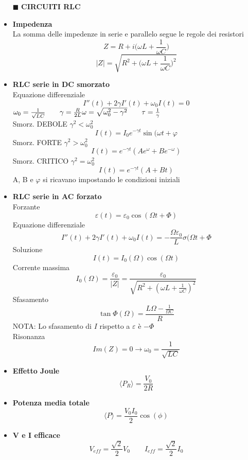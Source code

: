 \documentclass{book}
\newcommand{\g}{\textbf}
\newcommand{\e}{\begin{equation}}
\newcommand{\ex}{\end{equation} }
\renewcommand{\it}{\item[$\cdot$]}
\begin{document}
\begin{multicols*}{4}
\begin{itemize}
\item [$\blacksquare$] \g{CIRCUITI RLC}
    \it \g{Impedenza} \\
    La somma delle impedenze in serie e parallelo segue le regole dei resistori
    \e{Z=R+i\biggl(\omega L+\frac{1}{\omega C}\biggr)} \ex
    \e{|Z|=\sqrt{R^2+\biggl(\omega L+\frac{1}{\omega C}\biggr)^2}} \ex
    \it \g{RLC serie in DC smorzato} \\
    Equazione differenziale
    \e{I''(t)+2\gamma I'(t)+\omega_0 I(t)=0} \ex
    $\omega_0=\frac{1}{\sqrt{LC}} \qquad \gamma=\frac{R}{2L} \\
    \omega=\sqrt{\omega_0^2-\gamma^2} \qquad \tau=\frac{1}{\gamma}$ \\
    Smorz. DEBOLE $\gamma^2<\omega_0^2$
    \e{I(t)=I_0 e^{-\gamma t} \sin(\omega t+\varphi} \ex
    Smorz. FORTE $\gamma^2>\omega_0^2$
    \e{I(t)=e^{-\gamma t}(Ae^\omega+Be^{-\omega})} \ex
    Smorz. CRITICO $\gamma^2=\omega_0^2$
    \e{I(t)=e^{-\gamma t}(A+Bt)} \ex
    A, B e $\varphi$ si ricavano impostando le condizioni iniziali
    \it \g{RLC serie in AC forzato} \\
    Forzante
    \e{\varepsilon(t)=\varepsilon_0\cos(\Omega t + \Phi)} \ex
    Equazione differenziale
    \e{I''(t)+2\gamma I'(t)+\omega_0 I(t)=-\frac{\Omega\varepsilon_0}{L}\sigma(\Omega t + \Phi} \ex
    Soluzione
    \e{I(t)=I_0(\Omega)\cos(\Omega t )} \ex
    Corrente massima
    \e{I_0(\Omega)=\frac{\varepsilon_0}{|Z|}=\frac{\varepsilon_0}{\sqrt{R^2+(\omega L+\frac{1}{\omega C})^2}}} \ex
    Sfasamento
    \e{\tan\Phi(\Omega)=\frac{L\Omega-\frac{1}{\Omega C}}{R}} \ex
    NOTA: Lo sfasamento di $I$ rispetto a $\varepsilon$ è $-\Phi$ \\
    Risonanza
    \e{Im(Z)=0 \rightarrow \omega_0=\frac{1}{\sqrt{LC}}} \ex
    \it \g{Effetto Joule}
    \e{\langle P_R\rangle=\frac{V_0}{2R}} \ex
    \it \g{Potenza media totale}
    \e{\langle P\rangle=\frac{V_0I_0}{2}\cos(\phi)} \ex
    \it \g{V e I efficace}
    \e{V_{eff}=\frac{\sqrt{2}}{2}V_0 \qquad I_{eff}=\frac{\sqrt{2}}{2}I_0} \ex


\end{itemize}
\end{multicols*}
\end{document}
